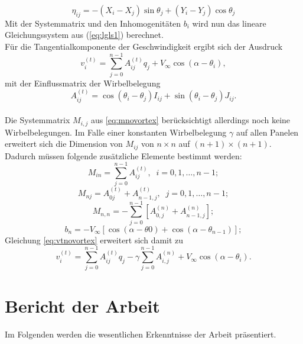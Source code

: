 \begin{equation}
\label{eq:eta}
\eta_{ij} =  -(X_i - X_j) \sin \theta _j + (Y_i - Y_j) \cos \theta _j
\end{equation}
Mit der Systemmatrix und den Inhomogenitäten $b_i$ wird nun das lineare Gleichungssystem aus (\ref{eq:lgls1}) berechnet. \\
Für die Tangentialkomponente der Geschwindigkeit ergibt sich der Ausdruck
\begin{equation}
\label{eq:vtnovortex}
v_i^{(t)} =  \sum_{j=0}^{n-1} A_{ij}^{(t)} q_j + V_{\infty} \cos{(\alpha - \theta_i)},
\end{equation}
mit der Einflussmatrix der Wirbelbelegung
\begin{equation}
\label{eq:At}
A_{ij}^{(t)} =  \cos{(\theta _i - \theta _j)} I_{ij} + \sin{(\theta _i - \theta _j)} J_{ij}.
\end{equation}
\\
Die Systemmatrix $M_{i,j}$ aus \eqref{eq:mnovortex} berücksichtigt allerdings noch keine Wirbelbelegungen. Im Falle einer konstanten Wirbelbelegung $\gamma$ auf allen Panelen erweitert sich die Dimension von $M_{ij}$ von $n \times n$ auf $(n+1) \times (n+1)$. Dadurch müssen folgende zusätzliche Elemente bestimmt werden:
\begin{equation}
M_{in} =  \sum_{j=0}^{n-1} A_{ij}^{(t)}, \;\; i=0,1,\ldots, n-1;
\end{equation}
\begin{equation}
M_{nj} =  A_{0j}^{(t)} + A_{n-1,j}^{(t)}, \;\; j =0,1,\ldots, n-1;
\end{equation}
\begin{equation}
M_{n,n} =  - \sum_{j=0}^{n-1} \left[ A_{0,j}^{(n)} + A_{n-1,j}^{(n)}\right];
\end{equation}
\begin{equation}
b_n =  -V_{\infty} [\cos{(\alpha -\theta 0)} + \cos{(\alpha -\theta _{n-1})}];
\end{equation}
Gleichung \eqref{eq:vtnovortex} erweitert sich damit zu
\begin{equation}
\label{eq:vtvortex}
v_i^{(t)} =  \sum_{j=0}^{n-1} A_{ij}^{(t)} q_j - \gamma \sum_{j=0}^{n-1}A_{i,j}^{(n)} + V_{\infty} \cos{(\alpha - \theta_i)}.
\end{equation}
\cite{Hess:1966} \cite{Cebeci:1999}
\newpage
\chapter{Bericht der Arbeit}
Im Folgenden werden die wesentlichen Erkenntnisse der Arbeit präsentiert.
